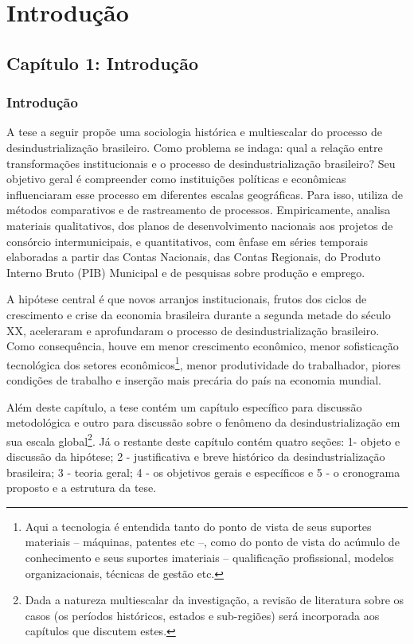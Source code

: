 \chapter{Introdução}

\section{Capítulo 1: Introdução}\label{capuxedtulo-1-projeto-de-qualificauxe7uxe3o}

\subsection{Introdução}\label{introduuxe7uxe3o}

A tese a seguir propõe uma sociologia histórica e multiescalar do
processo de desindustrialização brasileiro. Como problema se indaga:
qual a relação entre transformações institucionais e o processo de
desindustrialização brasileiro? Seu objetivo geral é compreender como
instituições políticas e econômicas influenciaram esse processo em
diferentes escalas geográficas. Para isso, utiliza de métodos
comparativos e de rastreamento de processos. Empiricamente, analisa
materiais qualitativos, dos planos de desenvolvimento nacionais aos
projetos de consórcio intermunicipais, e quantitativos, com ênfase em
séries temporais elaboradas a partir das Contas Nacionais, das Contas
Regionais, do Produto Interno Bruto (PIB) Municipal e de pesquisas sobre
produção e emprego.

A hipótese central é que novos arranjos institucionais, frutos dos
ciclos de crescimento e crise da economia brasileira durante a segunda
metade do século XX, aceleraram e aprofundaram o processo de
desindustrialização brasileiro. Como consequência, houve em menor
crescimento econômico, menor sofisticação tecnológica dos setores
econômicos\footnote{Aqui a tecnologia é entendida tanto do ponto de
  vista de seus suportes materiais -- máquinas, patentes etc --, como do
  ponto de vista do acúmulo de conhecimento e seus suportes imateriais
  -- qualificação profissional, modelos organizacionais, técnicas de
  gestão etc.}, menor produtividade do trabalhador, piores condições de
trabalho e inserção mais precária do país na economia mundial.

Além deste capítulo, a tese contém um capítulo específico para
discussão metodológica e outro para discussão sobre o fenômeno da
desindustrialização em sua escala global\footnote{Dada a natureza
  multiescalar da investigação, a revisão de literatura sobre os casos
  (os períodos históricos, estados e sub-regiões) será incorporada aos
  capítulos que discutem estes.}. Já o restante deste capítulo contém
quatro seções: 1- objeto e discussão da hipótese; 2 - justificativa e
breve histórico da desindustrialização brasileira; 3 - teoria geral; 4 -
os objetivos gerais e específicos e 5 - o cronograma proposto e a
estrutura da tese.

